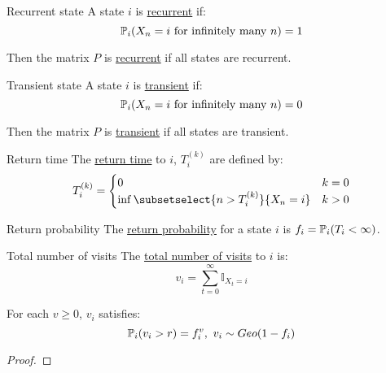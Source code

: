 \documentclass[../Main.tex]{subfiles}
\begin{document}
\begin{definition}{Recurrent state}
    A state $i$ is \underline{recurrent} if:
    \begin{equation*}
        \P_i(X_n = i \text{ for infinitely many }n) = 1
    \end{equation*}
\end{definition}
Then the matrix $P$ is \underline{recurrent} if all states are recurrent.
\begin{definition}{Transient state}
    A state $i$ is \underline{transient} if:
    \begin{equation*}
        \P_i(X_n = i \text{ for infinitely many }n) = 0
    \end{equation*}
\end{definition}
Then the matrix $P$ is \underline{transient} if all states are transient.
\begin{definition}{Return time}
    The \underline{return time} to $i$, $T_i^{(k)}$ are defined by:
    \begin{equation*}
        T_i^{(k)} =
        \begin{cases}
            0 & k=0 \\
            \inf\subsetselect{n>T_i^{(k)}}{X_n = i} & k > 0
        \end{cases}
    \end{equation*}
\end{definition}
\begin{definition}{Return probability}
    The \underline{return probability} for a state $i$ is $f_i = \P_i(T_i < \infty)$.
\end{definition}
\begin{definition}{Total number of visits}
    The \underline{total number of visits} to $i$ is:
    \begin{equation*}
        v_i = \sum_{t = 0}^\infty \mathbb{I}_{X_t = i}
    \end{equation*}
\end{definition}
\begin{lemma}
    For each $v \geq 0$, $v_i$ satisfies:
    \begin{equation*}
        \P_i(v_i > r) = f_i^v,~v_i \sim Geo(1-f_i)
    \end{equation*}
    \label{lemReturnGeometric}
\end{lemma}
\begin{proof}
\end{proof}
\end{document}
